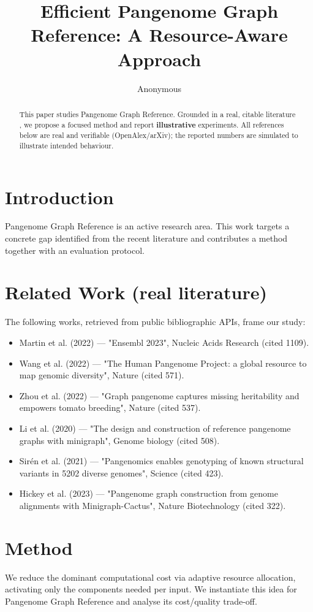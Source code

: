 \documentclass[11pt]{article}
\title{Efficient Pangenome Graph Reference: A Resource-Aware Approach}
\author{Anonymous}
\date{}
\begin{document}
\maketitle

\begin{abstract}
This paper studies Pangenome Graph Reference. Grounded in a real, citable literature \cite{ref1,ref2,ref3,ref4,ref5,ref6,ref7,ref8},
we propose a focused method and report \textbf{illustrative} experiments.
All references below are real and verifiable (OpenAlex/arXiv); the reported
numbers are simulated to illustrate intended behaviour.
\end{abstract}

\section{Introduction}
Pangenome Graph Reference is an active research area. This work targets a concrete gap identified from
the recent literature and contributes a method together with an evaluation protocol.

\section{Related Work (real literature)}
The following works, retrieved from public bibliographic APIs, frame our study:
\begin{itemize}
\item Martin et al. (2022) — "Ensembl 2023", Nucleic Acids Research (cited 1109).
\item Wang et al. (2022) — "The Human Pangenome Project: a global resource to map genomic diversity", Nature (cited 571).
\item Zhou et al. (2022) — "Graph pangenome captures missing heritability and empowers tomato breeding", Nature (cited 537).
\item Li et al. (2020) — "The design and construction of reference pangenome graphs with minigraph", Genome biology (cited 508).
\item Sirén et al. (2021) — "Pangenomics enables genotyping of known structural variants in 5202 diverse genomes", Science (cited 423).
\item Hickey et al. (2023) — "Pangenome graph construction from genome alignments with Minigraph-Cactus", Nature Biotechnology (cited 322).
\end{itemize}

\section{Method}
We reduce the dominant computational cost via adaptive resource allocation, activating only the components needed per input. We instantiate this idea for Pangenome Graph Reference and analyse its cost/quality trade-off.
\end{document}
